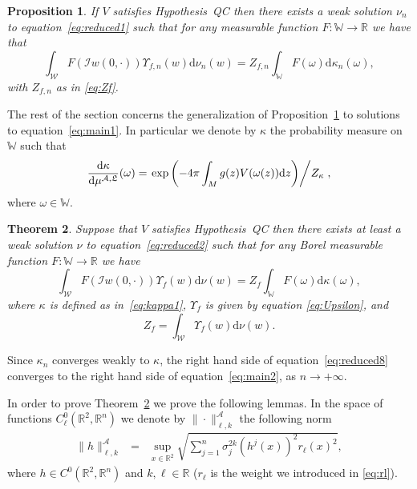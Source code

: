 \documentclass[a4paper,10pt]{article}
\newcommand{\mathd}{\mathrm{d}}
\newtheorem{theorem}{Theorem}
\newtheorem{proposition}[theorem]{Proposition}
{\theorembodyfont{\rmfamily}\newtheorem{remark}[theorem]{Remark}}
\begin{document}
\begin{proposition}
  \label{proposition_reduced1}If $V$ satisfies Hypothesis~QC then there exists
  a weak solution $\nu_n$ to equation~{\eqref{eq:reduced1}} such that for any
  measurable function $F : \mathbb{W} \rightarrow \mathbb{R}$ we have that
  \begin{equation}
    \int_{\mathcal{W}} F (\mathcal{I} w (0, \cdot)) \Upsilon_{f, n} (w) \mathd
    \nu_n (w) = Z_{f, n} \int_{\mathbb{W}} F (\omega) \mathd \kappa_n
    (\omega), \label{eq:reduced8}
  \end{equation}
  with $Z_{f, n}$ as in {\eqref{eq:Zf}}.
\end{proposition}

The rest of the section concerns the generalization of
Proposition~\ref{proposition_reduced1} to solutions to
equation~{\eqref{eq:main1}}. In particular we denote by $\kappa$ the
probability measure on $\mathbb{W}$ such that
\begin{equation}
  \frac{\mathd \kappa}{\mathd \mu^{\mathfrak{\mathcal{A}, L}}} (\omega) =
  \left. \exp \left( - 4 \pi \int_M g (z) V (\omega (z)) \mathd z \right)
  \middle/ Z_{\kappa} \right. \label{eq:kappa2},
\end{equation}
where $\omega \in \mathbb{W}$.

\begin{theorem}
  \label{theorem_main}Suppose that $V$ satisfies Hypothesis~QC then there
  exists at least a weak solution $\nu$ to equation~{\eqref{eq:reduced2}} such
  that for any Borel measurable function $F : \mathbb{W} \rightarrow
  \mathbb{R}$ we have
  \begin{equation}
    \int_{\mathcal{W}} F (\mathcal{} \mathcal{I} w (0, \cdot)) \Upsilon_f (w)
    \mathd \nu (w) = Z_f \int_{\mathbb{W}} F (\omega) \mathd \kappa (\omega)
    \label{eq:main2},
  \end{equation}
  where $\kappa$ is defined as in~{\eqref{eq:kappa1}}, $\Upsilon_f$ is given
  by equation {\eqref{eq:Upsilon}}, and
  \[ Z_f = \int_{\mathcal{W}} \Upsilon_f (w) \mathd \nu (w) . \]
\end{theorem}

\begin{remark}
  Since $\kappa_n$ converges weakly to $\kappa$, the right hand side of
  equation~{\eqref{eq:reduced8}} converges to the right hand side of
  equation~{\eqref{eq:main2}}, as $n \rightarrow + \infty$. 
\end{remark}

In order to prove Theorem~\ref{theorem_main} we prove the following lemmas. In
the space of functions $C^0_{\ell} (\mathbb{R}^2, \mathbb{R}^n)$ we denote by
$\| \cdot \|^{\mathcal{A}}_{\ell, k}$ the following norm
\begin{eqnarray}
  \| h \|^{\mathcal{A}}_{\ell, k} & = & \sup_{x \in \mathbb{R}^2}
  \sqrt{\sum_{j = 1}^n \sigma_j^{2 k} (h^j (x))^2 r_{\ell} (x)^2}, \nonumber
\end{eqnarray}
where $h \in C^0 (\mathbb{R}^2, \mathbb{R}^n)$ and $k, \ell \in \mathbb{R}$
($r_{\ell}$ is the weight we introduced in {\eqref{eq:rl}}).
\end{document}
